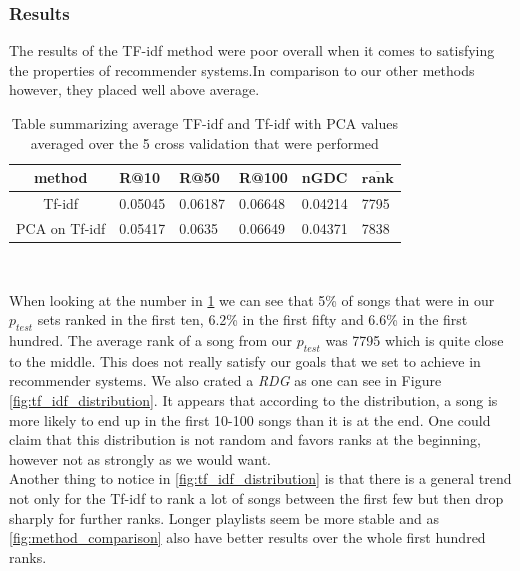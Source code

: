 \subsubsection{Results}

The results of the TF-idf method were poor overall when it comes to satisfying the properties of recommender systems.In comparison to our other methods however, they placed well above average. \\

\begin{table}[h]
\centering
\renewcommand{\arraystretch}{1.5}
\begin{tabu} to 1\textwidth {| c || X[c] | X[c] | X[c] | X[c] | X[c] | }
 \hline
 \textbf{method} & \textbf{R@10} & \textbf{R@50} & \textbf{R@100} & \textbf{nGDC} & $ \boldsymbol{\overline{rank}} $ \\
 \hline
 \hline
 Tf-idf & 0.05045 & 0.06187 & 0.06648 & 0.04214 & 7795 \\
 \hline
 PCA on Tf-idf & 0.05417 & 0.0635 & 0.06649 & 0.04371 & 7838 \\
 \hline
\end{tabu} \\
\caption{Table summarizing average TF-idf and Tf-idf with PCA values averaged over the 5 cross validation that were performed}
\label{table:1}
\end{table}

When looking at the number in \ref{table:1} we can see that 5\% of songs that were in our $p_{test}$ sets ranked in the first ten, 6.2\% in the first fifty and 6.6\% in the first hundred. The average rank of a song from our $p_{test}$ was 7795 which is quite close to the middle. This does not really satisfy our goals that we set to achieve in recommender systems. We also crated a \textit{RDG} as one can see in Figure \ref{fig:tf_idf_distribution}. It appears that according to the distribution, a song is more likely to end up in the first 10-100 songs than it is at the end. One could claim that this distribution is not random and favors ranks at the beginning, however not as strongly as we would want.\\
Another thing to notice in \ref{fig:tf_idf_distribution} is that there is a general trend not only for the Tf-idf to rank a lot of songs between the first few but then drop sharply for further ranks. Longer playlists seem be more stable and as \ref{fig:method_comparison} also have better results over the whole first hundred ranks.

